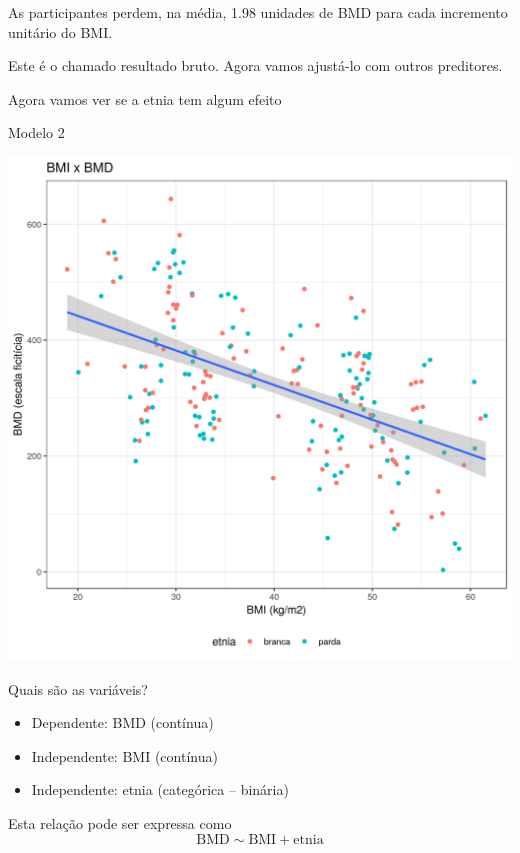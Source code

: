 \documentclass{beamer}
\begin{document}
\begin{frame}
  \begin{block}{}
    As participantes perdem, na média, 1.98 unidades de BMD para cada incremento unitário do BMI.

    \bigskip
    Este é o chamado resultado bruto. Agora vamos ajustá-lo com outros preditores.
  \end{block}
\end{frame}

\begin{frame}
  \begin{center}
    Agora vamos ver se a etnia tem algum efeito
  \end{center}
\end{frame}

\begin{frame}{\small Modelo 2}
  \begin{center}
    \includegraphics[height=.9\textheight]{Cap31-32/pratica-rlm2_0}
  \end{center}
\end{frame}

\begin{frame}{Quais são as variáveis?}
  \begin{itemize}
  \item Dependente: BMD (contínua)
  \item Independente: BMI (contínua)
  \item Independente: etnia (categórica -- binária)
  \end{itemize}
  \vfill
  \begin{block}{Esta relação pode ser expressa como}
    \begin{displaymath}
      \text{BMD} \sim \text{BMI} + \text{etnia}
    \end{displaymath}
  \end{block}
\end{frame}
\end{document}
